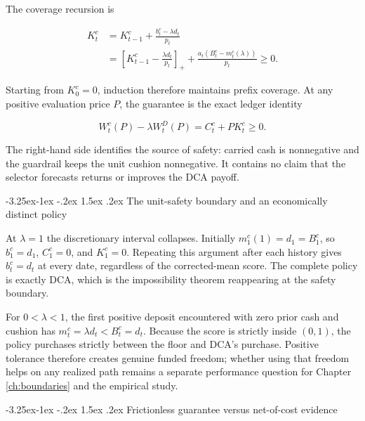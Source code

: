 \documentclass[12pt,a4paper,oneside]{report}
\makeatletter
\renewcommand\subsection{\@startsection{subsection}{2}{\z@}%
  {-3.25ex\@plus -1ex \@minus -.2ex}%
  {1.5ex \@plus .2ex}%
  {\normalfont\fontsize{12}{15}\selectfont\bfseries}}
\makeatother
\begin{document}
The coverage recursion is

\begin{equation}
  \begin{split}
  K_t^c
  &=K_{t-1}^c+\frac{b_t^c-\lambda d_t}{p_t}\\
  &=\left[K_{t-1}^c-\frac{\lambda d_t}{p_t}\right]_+
    +\frac{a_t\left(B_t^c-m_t^c(\lambda)\right)}{p_t}
    \geq0.
  \end{split}
  \label{eq:guarded-cushion-recursion}
\end{equation}

Starting from $K_0^c=0$, induction therefore maintains prefix coverage. At any
positive evaluation price $P$, the guarantee is the exact ledger identity

\begin{equation}
  W_t^c(P)-\lambda W_t^D(P)=C_t^c+P K_t^c\geq0.
  \label{eq:guarded-policy-safety}
\end{equation}

The right-hand side identifies the source of safety: carried cash is
nonnegative and the guardrail keeps the unit cushion nonnegative. It contains
no claim that the selector forecasts returns or improves the DCA payoff.



\subsection{The unit-safety boundary and an economically distinct policy}
\label{sec:lambda-boundary}

At $\lambda=1$ the discretionary interval collapses. Initially
$m_1^c(1)=d_1=B_1^c$, so $b_1^c=d_1$, $C_1^c=0$, and $K_1^c=0$.
Repeating this argument after each history gives $b_t^c=d_t$ at every date,
regardless of the corrected-mean score. The complete policy is exactly DCA,
which is the impossibility theorem reappearing at the safety boundary.

For $0<\lambda<1$, the first positive deposit encountered with zero prior
cash and cushion has $m_t^c=\lambda d_t<B_t^c=d_t$. Because the score is
strictly inside $(0,1)$, the policy purchases strictly between the floor and
DCA's purchase. Positive tolerance therefore creates genuine funded freedom;
whether using that freedom helps on any realized path remains a separate
performance question for Chapter \ref{ch:boundaries} and the empirical study.

\subsection{Frictionless guarantee versus net-of-cost evidence}
\label{sec:frictionless-safety-boundary}
\end{document}
